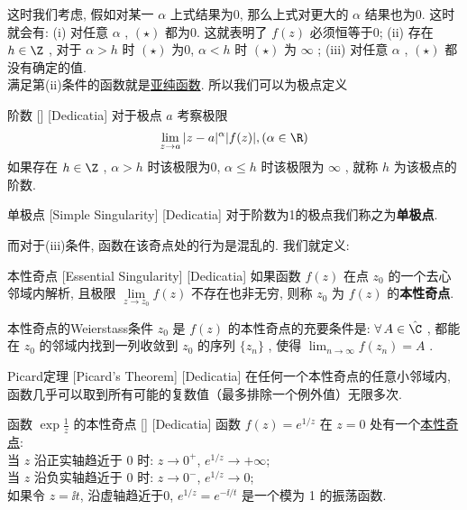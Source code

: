 \documentclass[UTF8]{ctexart}
\newcommand{\MeromorphicFunction}{\hyperref[dfn:MeromorphicFunction]{亚纯函数}}
\newcommand{\EssentialSingularity}{\hyperref[dfn:EssentialSingularity]{本性奇点}}
\begin{document}
这时我们考虑, 假如对某一 \( \alpha \) 上式结果为0, 那么上式对更大的 \( \alpha \) 结果也为0. 这时就会有: (i) 对任意 \( \alpha \) ,  \( (\star) \) 都为0. 这就表明了 \( f(z) \) 必须恒等于0; (ii) 存在 \( h\in\Z \) , 对于 \( \alpha>h \) 时 \( (\star) \) 为0,  \( \alpha<h \) 时 \( (\star) \) 为 \( \infty \) ; (iii) 对任意 \( \alpha \) ,  \( (\star) \) 都没有确定的值. \\
满足第(ii)条件的函数就是\MeromorphicFunction. 所以我们可以为极点定义
\begin{dfn}
    [UUID]
    {阶数}
    []
    [Dedicatia]
    对于极点 \( a \) 考察极限
    \[\lim_{z\to a}|z-a|^\alpha |f(z)|, (\alpha\in\R)\]
    如果存在 \( h\in\Z \) ,  \( \alpha>h \) 时该极限为0,  \( \alpha\leq h \) 时该极限为 \( \infty \) , 就称 \( h \) 为该极点的阶数. 
\end{dfn}
\begin{dfn}
    [SimpleSingularity]
    {单极点}
    [Simple Singularity]
    [Dedicatia]
    对于阶数为1的极点我们称之为\textbf{单极点}. 
\end{dfn}
而对于(iii)条件, 函数在该奇点处的行为是混乱的. 我们就定义: 
\begin{dfn}
    [EssentialSingularity]
    {本性奇点}
    [Essential Singularity]
    [Dedicatia]
    如果函数 \( f(z) \) 在点 \( z_0 \) 的一个去心邻域内解析, 且极限 \( \lim\limits_{z \to z_0} f(z) \) 不存在也非无穷, 则称 \( z_0 \) 为 \( f(z) \) 的\textbf{本性奇点}. 
\end{dfn}
\begin{thm}
    {本性奇点的Weierstass条件}
     \( z_0 \) 是 \( f(z) \) 的本性奇点的充要条件是:  \( \forall\,A\in\hat{\C} \) , 都能在 \( z_0 \) 的邻域内找到一列收敛到 \( z_0 \) 的序列 \( \{z_n\} \) , 使得 \( \lim_{n\to\infty}f(z_n)=A \) .
\end{thm}
\begin{thm}
    [UUID]
    {Picard定理}
    [Picard's Theorem]
    [Dedicatia]
    在任何一个本性奇点的任意小邻域内, 函数几乎可以取到所有可能的复数值（最多排除一个例外值）无限多次. 
\end{thm}
\begin{xmp}
    [UUID]
    {函数 \( \exp\frac{1}{z} \) 的本性奇点}
    []
    [Dedicatia]
    函数 \( f(z) = e^{1/z} \) 在 \( z=0 \) 处有一个\EssentialSingularity :\\
    当 \( z \) 沿正实轴趋近于 0 时: \( z \to 0^+ \), \( e^{1/z} \to +\infty \);\\ 
    当 \( z \) 沿负实轴趋近于 0 时: \( z \to 0^- \), \( e^{1/z} \to 0 \);\\
    如果令 \( z =\ii t \), 沿虚轴趋近于0, \( e^{1/z} = e^{-\ii/t} \) 是一个模为 1 的振荡函数.
\end{xmp}
\end{document}
